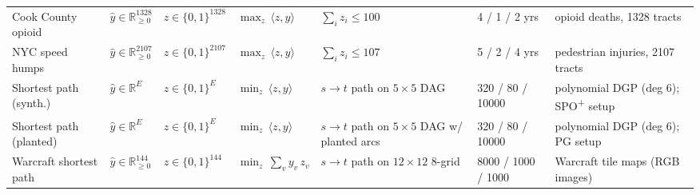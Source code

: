 \begin{table}[t]
{\begin{tabular}{@{}lllllll@{}}
Cook County opioid & $\hat y\in\mathbb{R}_{\ge 0}^{1328}$ & $z\in\{0,1\}^{1328}$ & $\max_z\,\langle z,y\rangle$ & $\sum_i z_i\le 100$ & 4 / 1 / 2 yrs & opioid deaths, 1328 tracts \\
NYC speed humps & $\hat y\in\mathbb{R}_{\ge 0}^{2107}$ & $z\in\{0,1\}^{2107}$ & $\max_z\,\langle z,y\rangle$ & $\sum_i z_i\le 107$ & 5 / 2 / 4 yrs & pedestrian injuries, 2107 tracts \\
Shortest path (synth.) & $\hat y\in\mathbb{R}^{E}$ & $z\in\{0,1\}^{E}$ & $\min_z\,\langle z,y\rangle$ & $s{\to}t$ path on $5{\times}5$ DAG & 320 / 80 / 10000 & polynomial DGP (deg 6); SPO\textsuperscript{+} setup \\
Shortest path (planted) & $\hat y\in\mathbb{R}^{E}$ & $z\in\{0,1\}^{E}$ & $\min_z\,\langle z,y\rangle$ & $s{\to}t$ path on $5{\times}5$ DAG w/ planted arcs & 320 / 80 / 10000 & polynomial DGP (deg 6); PG setup \\
Warcraft shortest path & $\hat y\in\mathbb{R}_{\ge 0}^{144}$ & $z\in\{0,1\}^{144}$ & $\min_z\,\sum_v y_v\,z_v$ & $s{\to}t$ path on $12{\times}12$ 8-grid & 8000 / 1000 / 1000 & Warcraft tile maps (RGB images) \\
\bottomrule
\end{tabular}%
}
\end{table}
